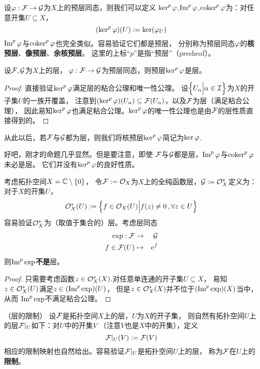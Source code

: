 设$\varphi:\mathcal{F}\to\mathcal{G}$为$X$上的预层同态，则我们可以定义
$\ker^p\varphi$,$\operatorname{Im}^p\varphi$,$\operatorname{coker}^p\varphi$为：对任意开集$U\subseteq X$，
$$(\ker^p\varphi)(U):=\ker(\varphi_U)$$
$\operatorname{Im}^p\varphi$与$\operatorname{coker}^p\varphi$也完全类似。容易验证它们都是预层，
分别称为预层同态$\varphi$的\textbf{核预层}、\textbf{像预层}、\textbf{余核预层}。
这里的上标“$p$”是指“预层”（presheaf）。

\begin{prop}设$\mathcal{F},\mathcal{G}$为$X$上的层，
$\varphi:\mathcal{F}\to\mathcal{G}$为预层同态，则预层$\ker^p\varphi$是层。
\end{prop}

\begin{proof}直接验证$\ker^p\varphi$满足层的粘合公理和唯一性公理。
设$\Big\{ U_\alpha \Big| \alpha\in\mathcal{I} \Big\}$为$X$的开子集$U$的一族开覆盖，
注意到$(\ker^p\varphi)(U_\alpha)\subseteq\mathcal{F}(U_\alpha)$，以及$\mathcal{F}$为层（满足粘合公理），
因此易知$\ker^p\varphi$也满足粘合公理。$\ker^p\varphi$的唯一性公理也是由$\mathcal{F}$的层性质直接得到的。
\end{proof}

从此以后，若$\mathcal{F}$与$\mathcal{G}$都为层，则我们将核预层$\ker^p\varphi$简记为$\ker\varphi$.

\begin{rem}好吧，刚才的命题几乎显然。但是要注意，即使
$\mathcal{F}$与$\mathcal{G}$都是层，$\operatorname{Im}^p\varphi$与$\operatorname{coker}^p\varphi$未必是层。
它们并没有$\ker^p\varphi$的良好性质。
\end{rem}

\begin{example}考虑拓扑空间$X=\mathbb{C}\setminus\{0\}$，
令$\mathcal{F}:=\mathcal{O}_X$为$X$上的全纯函数层，$\mathcal{G}:=\mathcal{O}^*_X$定义为：
对于$X$的开集$U$，
$$\mathcal{O}^*_X(U):=\Big\{ f\in\mathcal{O}_X(U) \Big| f(z)\neq 0\,,\forall z\in U \Big\}$$
容易验证$\mathcal{O}^*_X$为（取值于集合的）层。考虑层同态
\begin{eqnarray*}
\exp:\mathcal{F}&\to&\mathcal{G}\\
f\in\mathcal{F}(U)&\mapsto&e^f
\end{eqnarray*}
则$\operatorname{Im}^p\exp$\textbf{不是}层。
\label{指数预层同态}
\end{example}

\begin{proof}
只需要考虑函数$z\in\mathcal{O}_X^*(X)$.对任意单连通的开子集$U\subseteq X$，
易知$z\in\mathcal{O}^*_X(U)$满足$z\in(\operatorname{Im}^p\exp)(U)$，
但是$z\in\mathcal{O}_X^*(X)$并不位于$(\operatorname{Im}^p\exp)(X)$当中，从而
$\operatorname{Im}^p\exp$不满足粘合公理。
\end{proof}

\begin{notation}（层的限制）
设$\mathcal{F}$是拓扑空间$X$上的层，$U$为$X$的开子集，
则自然有拓扑空间$U$上的层$\mathcal{F}|_U$如下：对$U$中的开集$V$
（注意$V$也是$X$中的开集），定义
$$\mathcal{F}|_U(V):=\mathcal{F}(V)$$
相应的限制映射也自然给出。容易验证$\mathcal{F}|_U$是拓扑空间$U$上的层，
称为$\mathcal{F}$在$U$上的\textbf{限制}。
\end{notation}

